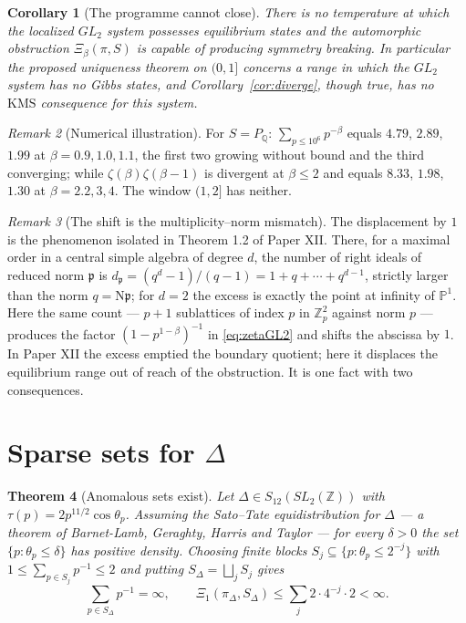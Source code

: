 \documentclass[11pt]{amsart}
\numberwithin{equation}{section}
\newtheorem{theorem}{Theorem}[section]
\newtheorem{corollary}[theorem]{Corollary}
\theoremstyle{definition}
\theoremstyle{remark}
\newtheorem{remark}[theorem]{Remark}
\newcommand{\Z}{\mathbb{Z}}
\newcommand{\Q}{\mathbb{Q}}
\newcommand{\Ns}{\mathrm{N}}
\newcommand{\pp}{\mathfrak{p}}
\begin{document}
\begin{corollary}[The programme cannot close]\label{cor:cannot}
There is no temperature at which the localized $GL_2$ system possesses equilibrium states and
the automorphic obstruction $\Xi_\beta(\pi,S)$ is capable of producing symmetry breaking. In
particular the proposed uniqueness theorem on $(0,1]$ concerns a range in which the $GL_2$
system has no Gibbs states, and Corollary~\ref{cor:diverge}, though true, has no
$\mathrm{KMS}$ consequence for this system.
\end{corollary}

\begin{remark}[Numerical illustration]\label{rem:num}
For $S=P_\Q$: $\sum_{p\le10^6}p^{-\beta}$ equals $4.79$, $2.89$, $1.99$ at
$\beta=0.9,1.0,1.1$, the first two growing without bound and the third converging; while
$\zeta(\beta)\zeta(\beta-1)$ is divergent at $\beta\le2$ and equals $8.33$, $1.98$, $1.30$ at
$\beta=2.2,3,4$. The window $(1,2]$ has neither.
\end{remark}

\begin{remark}[The shift is the multiplicity--norm mismatch]\label{rem:mismatch}
The displacement by $1$ is the phenomenon isolated in Theorem 1.2 of Paper XII. There, for a
maximal order in a central simple algebra of degree $d$, the number of right ideals of reduced
norm $\pp$ is $d_\pp=(q^d-1)/(q-1)=1+q+\cdots+q^{d-1}$, strictly larger than the norm
$q=\Ns\pp$; for $d=2$ the excess is exactly the point at infinity of $\mathbb P^1$. Here the
same count --- $p+1$ sublattices of index $p$ in $\Z_p^2$ against norm $p$ --- produces the
factor $(1-p^{1-\beta})^{-1}$ in \eqref{eq:zetaGL2} and shifts the abscissa by $1$. In
Paper XII the excess emptied the boundary quotient; here it displaces the equilibrium
range out of reach of the obstruction. It is one fact with two consequences.
\end{remark}

\section{Sparse sets for $\Delta$}

\begin{theorem}[Anomalous sets exist]\label{thm:sparse}
Let $\Delta\in S_{12}(SL_2(\Z))$ with $\tau(p)=2p^{11/2}\cos\theta_p$. Assuming the Sato--Tate
equidistribution for $\Delta$ --- a theorem of Barnet-Lamb, Geraghty, Harris and Taylor \cite{BLGHT} --- for
every $\delta>0$ the set $\{p:\theta_p\le\delta\}$ has positive density. Choosing finite
blocks $S_j\subseteq\{p:\theta_p\le2^{-j}\}$ with $1\le\sum_{p\in S_j}p^{-1}\le2$ and putting
$S_\Delta=\bigsqcup_jS_j$ gives
\[
\sum_{p\in S_\Delta}p^{-1}=\infty,\qquad \Xi_1(\pi_\Delta,S_\Delta)\le\sum_j2\cdot4^{-j}\cdot2<\infty .
\]
\end{theorem}
\end{document}

